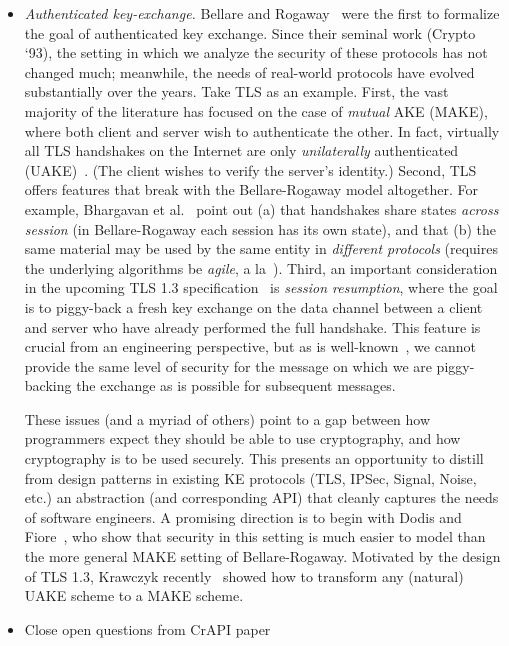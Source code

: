 \begin{itemize}
  \item \emph{Authenticated key-exchange.}
    Bellare and Rogaway~\cite{bellare1993entity} were the first to formalize the
    goal of authenticated key exchange. Since their seminal work (Crypto `93),
    the setting in which we analyze the security of these protocols has not
    changed much; meanwhile, the needs of real-world protocols have evolved
    substantially over the years. Take TLS as an example.
    First, the vast majority of the literature has focused on the case of
    \emph{mutual} AKE (MAKE), where both client and server wish to authenticate the
    other. In fact, virtually all TLS handshakes on the Internet are only
    \emph{unilaterally} authenticated (UAKE)~\cite{xxx}. (The client
    wishes to verify the server's identity.)
    Second, TLS offers features that break with the Bellare-Rogaway model
    altogether. For example, Bhargavan et al.~\cite{bhargavan2014proving} point
    out (a) that handshakes share states \emph{across session} (in
    Bellare-Rogaway each session has its own state), and that (b) the same
    material may be used by the same entity in \emph{different protocols}
    (requires the underlying algorithms be \emph{agile}, a
    la~\cite{acar2010cryptographic}).
    Third, an important consideration in the upcoming TLS 1.3
    specification~\cite{tls13} is \emph{session resumption}, where the goal is
    to piggy-back a fresh key exchange on the data channel between a client and
    server who have already performed the full handshake. This feature is
    crucial from an engineering perspective, but as is well-known~\cite{xxx}, we
    cannot provide the same level of security for the message on which we are
    piggy-backing the exchange as is possible for subsequent messages.

    These issues (and a myriad of others) point to a gap between how programmers
    expect they should be able to use cryptography, and how cryptography
    is to be used securely. This presents an opportunity to distill from design
    patterns in existing KE protocols (TLS, IPSec, Signal, Noise, etc.) an
    abstraction (and corresponding API) that cleanly captures the needs of
    software engineers.
    A promising direction is to begin with Dodis and
    Fiore~\cite{dodis2017unilateral}, who show that security in this setting is
    much easier to model than the more general MAKE setting of Bellare-Rogaway.
    Motivated by the design of TLS 1.3, Krawczyk
    recently~\cite{krawczyk2016unilateral-to-mutual} showed how to transform any
    (natural) UAKE scheme to a MAKE scheme.

\item {Close open questions from CrAPI paper}
\end{itemize}

